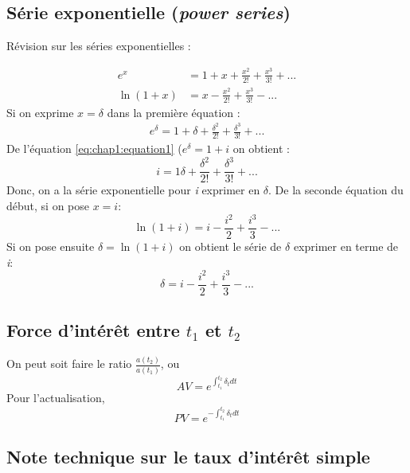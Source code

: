 \documentclass[11pt,french]{report}
\newcommand{\fact}[1]{#1\mathpunct{}!}
\begin{document}
\subsection{Série exponentielle (\textit{power series})}
\label{sub:Power serie}

Révision sur les séries exponentielles :

\begin{align*}
e^x & = 1 + x + \frac{x^2}{\fact{2}} + \frac{x^3}{\fact{3}} + ... \\
\ln(1+x) & = x - \frac{x^2}{\fact{2}} + \frac{x^3}{\fact{3}} - ...
\end{align*}
Si on exprime $x= \delta$ dans la première équation :
\begin{align*}
e^{\delta} = 1 + \delta + \frac{\delta^2}{\fact{2}} + \frac{\delta^3}{\fact{3}} + ...
\end{align*}
De l'équation \ref{eq:chap1:equation1} ($e^{\delta} =1+i$ on obtient :
\begin{equation}
i = 1\delta + \frac{\delta^2}{\fact{2}} + \frac{\delta^3}{\fact{3}} + ... 
\end{equation}
Donc, on a la série exponentielle pour \textit{i} exprimer en $\delta$.
De la seconde équation du début, si on pose $ x = i$:
\begin{equation}
\ln(1+i) = i - \frac{i^2}{2} + \frac{i^3}{3} - ...
\end{equation}
Si on pose ensuite $\delta = \ln (1+i)$ on obtient le série de $\delta$ exprimer en terme de \textit{i}:
\begin{equation}
\delta = i - \frac{i^2}{2} + \frac{i^3}{3} - ...
\end{equation}

\subsection{Force d'intérêt entre $t_1$ et $t_2$}
\label{sec:sub:taux interet variable}

On peut soit faire le ratio $\frac{a(t_2)}{a(t_1)}$, ou
\begin{equation}
AV = e^{\int_{t_1}^{t_2}\delta_t dt}
\end{equation}
Pour l'actualisation,
\begin{equation}
PV = e^{- \int_{t_1}^{t_2}\delta_t dt}
\end{equation}

\subsection{Note technique sur le taux d'intérêt simple}
\label{note:chap1}
\end{document}
